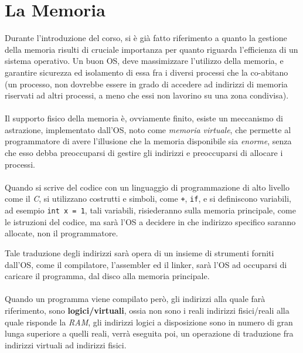 \documentclass[12pt, letterpaper]{article}
\newcommand{\code}[1]{\colorbox{light-gray}{\texttt{#1}}}
\newcommand{\acc}{\\\hphantom{}\\}
\begin{document}
\section{La Memoria}
Durante l'introduzione del corso, si è già fatto riferimento a quanto la gestione della memoria risulti di cruciale 
importanza per quanto riguarda l'efficienza di un sistema operativo. Un buon OS, deve massimizzare l'utilizzo della 
memoria, e garantire sicurezza ed isolamento di essa fra i diversi processi che la co-abitano (un processo, non 
dovrebbe essere in grado di accedere ad indirizzi di memoria riservati ad altri processi, a meno che essi non lavorino 
su una zona condivisa).\acc 
Il supporto fisico della memoria è, ovviamente finito, esiste un meccanismo di astrazione, implementato 
dall'OS, noto come \textit{memoria virtuale}, che permette al programmatore di avere l'illusione che la memoria 
disponibile sia \textit{enorme}, senza che esso debba preoccuparsi di gestire gli indirizzi e preoccuparsi di 
allocare i processi.\acc 
Quando si scrive del codice con un linguaggio di programmazione di alto livello come il \textit{C}, si utilizzano 
costrutti e simboli, come \code{+}, \code{if}, e si definiscono variabili, ad esempio \code{int x = 1}, tali variabili, 
risiederanno sulla memoria principale, come le istruzioni del codice, ma sarà l'OS a decidere in che indirizzo specifico saranno allocate, non il 
programmatore.

Tale traduzione degli indirizzi sarà opera di un insieme di strumenti forniti dall'OS, come il compilatore, l'assembler 
ed il linker, sarà l'OS ad occuparsi di caricare il programma, dal disco alla memoria principale.\acc 
Quando un programma viene compilato però, gli indirizzi alla quale farà riferimento, sono \textbf{logici/virtuali}, ossia 
non sono i reali indirizzi fisici/reali alla quale risponde la \textit{RAM}, gli indirizzi logici a disposizione sono in numero di gran 
lunga superiore a quelli reali, verrà eseguita poi, un operazione di traduzione fra indirizzi virtuali ad indirizzi fisici.
\end{document}
